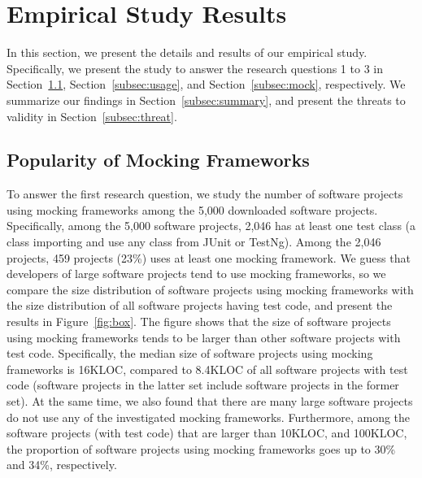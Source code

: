\section{Empirical Study Results}
\label{sec:studymock}


In this section, we present the details and results of our empirical study. Specifically, we present the study to answer the research questions 1 to 3 in Section~\ref{subsec:pop}, Section~\ref{subsec:usage}, and Section~\ref{subsec:mock}, respectively. We summarize our findings in Section~\ref{subsec:summary}, and present the threats to validity in Section~\ref{subsec:threat}. 

\subsection{Popularity of Mocking Frameworks}
\label{subsec:pop}


To answer the first research question, we study the number of software projects using mocking frameworks among the 5,000 downloaded software projects. Specifically, among the 5,000 software projects, 2,046 has at least one test class (a class importing and use any class from JUnit or TestNg). Among the 2,046 projects, 459 projects (23\%) uses at least one mocking framework. We guess that developers of large software projects tend to use mocking frameworks, so we compare the size distribution of software projects using mocking frameworks with the size distribution of all software projects having test code, and present the results in Figure~\ref{fig:box}. The figure shows that the size of software projects using mocking frameworks tends to be larger than other software projects with test code. Specifically, the median size of software projects using mocking frameworks is 16KLOC,  compared to 8.4KLOC of all software projects with test code (software projects in the latter set include software projects in the former set). At the same time, we also found that there are many large software projects do not use any of the investigated mocking frameworks. Furthermore, among the software projects (with test code) that are larger than 10KLOC, and 100KLOC, the proportion of software projects using mocking frameworks goes up to 30\% and 34\%, respectively. 


